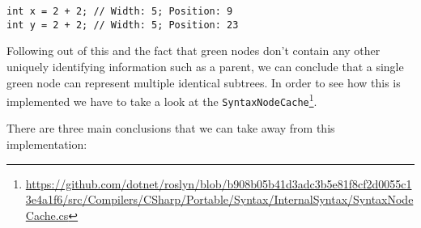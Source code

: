 \begin{lstlisting}
int x = 2 + 2; // Width: 5; Position: 9
int y = 2 + 2; // Width: 5; Position: 23
\end{lstlisting}

Following out of this and the fact that green nodes don't contain any other uniquely identifying information such as a parent, we can conclude that a single green node can represent multiple identical subtrees. In order to see how this is implemented we have to take a look at the \texttt{SyntaxNodeCache}\footnote{\url{https://github.com/dotnet/roslyn/blob/b908b05b41d3adc3b5e81f8cf2d0055c13e4a1f6/src/Compilers/CSharp/Portable/Syntax/InternalSyntax/SyntaxNodeCache.cs}}.

There are three main conclusions that we can take away from this implementation:

